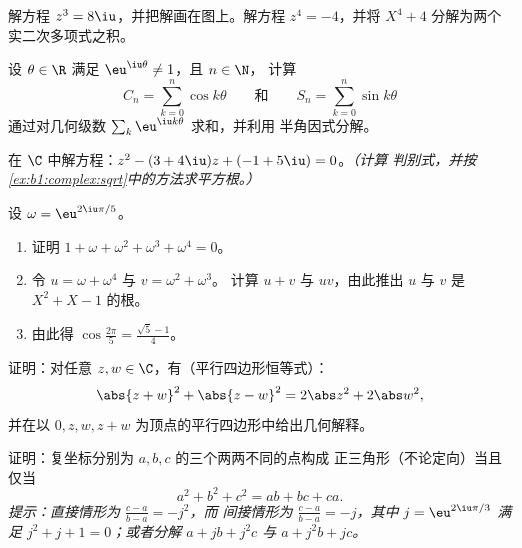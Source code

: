 \begin{exercise}[$\star$]\label{exo:b1:complex:5}
解方程 $z^3 = 8\iu$，并把解画在图上。解方程
$z^4 = -4$，并将 $X^4 + 4$ 分解为两个实二次多项式之积。
\end{exercise}

\begin{exercise}[$\star\star$]\label{exo:b1:complex:6}
设 $\theta \in \R$ 满足 $\eu^{\iu\theta} \neq 1$，且 $n \in \N$，
计算
\[
C_n = \sum_{k=0}^{n} \cos k\theta
\qquad\text{和}\qquad
S_n = \sum_{k=0}^{n} \sin k\theta
\]
通过对几何级数 $\sum_k \eu^{\iu k\theta}$ 求和，并利用
半角因式分解。
\end{exercise}

\begin{exercise}[$\star\star$]\label{exo:b1:complex:7}
在 $\C$ 中解方程：$z^2 - (3 + 4\iu) z + (-1 + 5\iu) = 0$。\emph{（计算
判别式，并按
\cref{ex:b1:complex:sqrt}中的方法求平方根。）}
\end{exercise}

\begin{exercise}[$\star\star$]\label{exo:b1:complex:8}
设 $\omega = \eu^{2\iu\pi/5}$。
\begin{enumerate}
  \item 证明 $1 + \omega + \omega^2 + \omega^3 + \omega^4 = 0$。
  \item 令 $u = \omega + \omega^4$ 与 $v = \omega^2 + \omega^3$。
        计算 $u + v$ 与 $uv$，由此推出 $u$ 与 $v$ 是
        $X^2 + X - 1$ 的根。
  \item 由此得 $\cos\frac{2\pi}{5} = \frac{\sqrt 5 - 1}{4}$。
\end{enumerate}
\end{exercise}

\begin{exercise}[$\star\star$]\label{exo:b1:complex:9}
证明：对任意 $z, w \in \C$，有（平行四边形恒等式）：
\[
\abs{z + w}^2 + \abs{z - w}^2 = 2\abs z^2 + 2\abs w^2 ,
\]
并在以 $0,
z, w, z + w$ 为顶点的平行四边形中给出几何解释。
\end{exercise}

\begin{exercise}[$\star\star\star$]\label{exo:b1:complex:10}
证明：复坐标分别为 $a, b, c$ 的三个两两不同的点构成
正三角形（不论定向）当且仅当
\[
a^2 + b^2 + c^2 = ab + bc + ca .
\]
\emph{提示：直接情形为 $\frac{c-a}{b-a} = -j^2$，而
间接情形为 $\frac{c-a}{b-a} = -j$，其中 $j = \eu^{2\iu\pi/3}$
满足 $j^2 + j + 1 = 0$；或者分解 $a + jb + j^2c$ 与 $a + j^2 b
+ jc$。}
\end{exercise}


